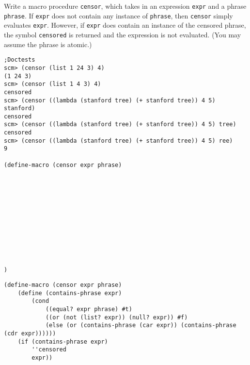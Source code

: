 \begin{blocksection}
\question Write a macro procedure \lstinline{censor}, which takes in an expression \lstinline{expr} and a phrase \lstinline{phrase}. If \lstinline{expr} does not contain any instance of \lstinline{phrase}, then \lstinline{censor} simply evaluates \lstinline{expr}. However, if \lstinline{expr} does contain an instance of the censored phrase, the symbol \lstinline{censored} is returned and the expression is not evaluated. (You may assume the phrase is atomic.)

\begin{lstlisting}
;Doctests
scm> (censor (list 1 24 3) 4)
(1 24 3)
scm> (censor (list 1 4 3) 4)
censored
scm> (censor ((lambda (stanford tree) (+ stanford tree)) 4 5) stanford)
censored
scm> (censor ((lambda (stanford tree) (+ stanford tree)) 4 5) tree)
censored
scm> (censor ((lambda (stanford tree) (+ stanford tree)) 4 5) ree)
9

(define-macro (censor expr phrase)
    











)
\end{lstlisting}

\begin{solution}
\begin{lstlisting}
(define-macro (censor expr phrase)
    (define (contains-phrase expr)
        (cond 
            ((equal? expr phrase) #t)
            ((or (not (list? expr)) (null? expr)) #f)
            (else (or (contains-phrase (car expr)) (contains-phrase (cdr expr))))))
    (if (contains-phrase expr)
        ''censored
        expr))
\end{lstlisting}
\end{solution}
\end{blocksection}